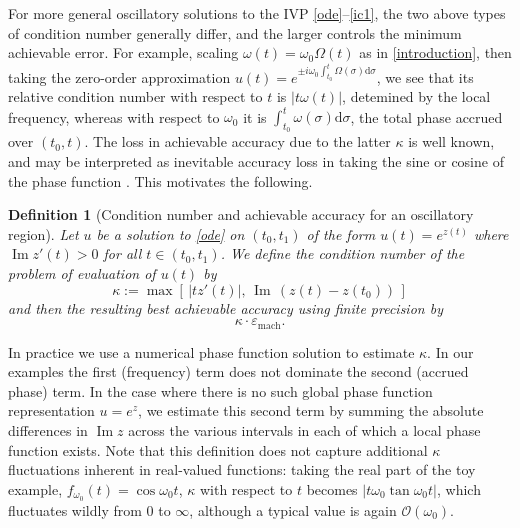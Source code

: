 \documentclass[10pt]{article}
\newcommand{\be}{\begin{equation}}
\newcommand{\ee}{\end{equation}}
\renewcommand{\d}{\mathrm{d}} %
\newcommand{\bigO}{{\mathcal O}}
\newcommand{\veps}{\varepsilon}
\DeclareMathOperator{\im}{Im}
\newtheorem{defn}[thm]{Definition}
\newcommand{\om}{\omega}
\begin{document}
For more general oscillatory solutions to the IVP \cref{ode}--\cref{ic1},
the two above types of condition number generally differ,
and the larger controls the minimum achievable error.
For example, scaling $\om(t)=\om_0 \Omega(t)$ as in \cref{introduction},
then taking the zero-order approximation
$u(t) = e^{\pm i \om_0 \int_{t_0}^t \Omega(\sigma) \d\sigma}$,
we see that its relative condition number with respect to
$t$ is $|t\om(t)|$, detemined by the local frequency,
whereas with respect to
$\om_0$ it is $\int_{t_0}^t \om(\sigma) \d\sigma$, the total phase
accrued over $(t_0,t)$.
The loss in achievable accuracy due to the latter $\kappa$
is well known, and may be interpreted as 
inevitable accuracy loss in taking the sine or cosine of the phase function
\cite{bremer2018}.
This motivates the following.
\begin{defn}[Condition number and achievable accuracy for an oscillatory region]
  \label{d:kappa}
  Let $u$ be a solution to \cref{ode} on $(t_0,t_1)$ of the form
  $u(t) = e^{z(t)}$ where $\im z'(t) > 0$ for all $t\in(t_0,t_1)$.
  We define the condition number of the problem of evaluation of $u(t)$
  by
  \be
  \kappa := \max\left[ \, |tz'(t)|, \, \im \, ( z(t) - z(t_0) )\, \right]
  \label{conditionnodef}
  \ee
  and then the resulting best achievable accuracy using finite precision by
  \be
  \kappa \cdot \veps_{\mathrm{mach}}.   %
  \label{mineps}
  \ee
\end{defn}
In practice we use a numerical phase function solution to estimate $\kappa$.
In our examples the first (frequency) term does not dominate the second (accrued phase) term.
In the case where there is no such global phase function
representation $u=e^z$, 
we estimate this second term
by summing the absolute differences in $\im z$ across
the various intervals in each of which a local phase function exists.
Note that this definition does not
capture additional $\kappa$ fluctuations inherent in real-valued
functions:
taking the real part of the toy example, $f_{\om_0}(t) = \cos \om_0 t$,
$\kappa$ with respect to $t$ becomes $|t\om_0 \tan \om_0 t|$,
which fluctuates wildly from $0$ to $\infty$,
although a typical value is again $\bigO(\om_0)$.
\end{document}
